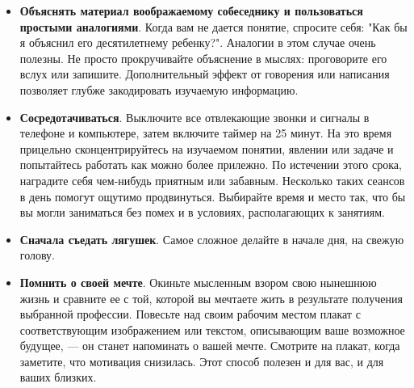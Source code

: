 \documentclass{article}
\begin{document}
\begin{itemize}
\item \textbf{Объяснять материал воображаемому собеседнику и пользоваться простыми аналогиями}. Когда вам не дается понятие, спросите себя: "Как бы я объяснил его десятилетнему ребенку?". Аналогии в этом случае очень полезны. Не просто прокручивайте объяснение в мыслях: проговорите его вслух или запишите. Дополнительный эффект от говорения или написания позволяет глубже закодировать изучаемую информацию.
\item \textbf{Сосредотачиваться}. Выключите все отвлекающие звонки и сигналы в телефоне и компьютере, затем включите таймер на 25 минут. На это время прицельно сконцентрируйтесь на изучаемом понятии, явлении или задаче и попытайтесь работать как можно более прилежно. По истечении этого срока, наградите себя чем-нибудь приятным или забавным. Несколько таких сеансов в день помогут ощутимо продвинуться. Выбирайте время и место так, что бы вы могли заниматься без помех и в условиях, располагающих к занятиям.
\item \textbf{Сначала съедать лягушек}. Самое сложное делайте в начале дня, на свежую голову.
\item \textbf{Помнить о своей мечте}. Окиньте мысленным взором свою нынешнюю жизнь и сравните ее с той, которой вы мечтаете жить в результате получения выбранной профессии. Повесьте над своим рабочим местом плакат с соответствующим изображением или текстом, описывающим ваше возможное будущее, --- он станет напоминать о вашей мечте. Смотрите на плакат, когда заметите, что мотивация снизилась. Этот способ полезен и для вас, и для ваших близких.
\end{itemize}
\end{document}
